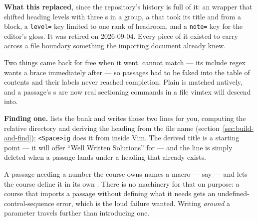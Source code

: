 \textbf{What this replaced}, since the repository's history is full of it: an
 wrapper that shifted heading levels with three s in
a group, a  that took its title and  from a
 block, a \texttt{level=} key limited to one rank of headroom,
and a \texttt{note=} key for the editor's gloss. It was retired on 2026-09-04.
Every piece of it existed to carry across a file boundary something the
importing document already knew.

Two things came back for free when it went.  cannot match
 --- its include regex wants a brace immediately after
 --- so passages had to be faked into the table of contents and
their labels never reached  completion. Plain  is matched
natively, and a passage's s are now real sectioning commands in
a file vimtex will descend into.

\textbf{Finding one.}  lists the bank and writes those two
lines for you, computing the relative directory and deriving the heading from
the file name (section~\ref{sec:build-and-find}); \texttt{<Space>ig} does it
from inside Vim. The derived title is a starting point --- it will offer
``Well Written Solutions'' for  --- and the
 line is simply deleted when a passage lands under a heading that
already exists.

A passage needing a number the course owns names a macro --- say
 --- and lets the course define it in its own
. There is no machinery for that on purpose: a course
that imports a passage without defining what it needs gets an
undefined-control-sequence error, which is the loud failure wanted. Writing
\emph{around} a parameter travels further than introducing one.
